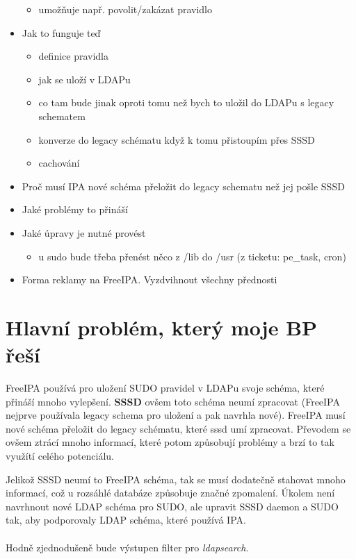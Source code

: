 \documentclass[10pt,a4paper,notitlepage]{article}
\begin{document}
\begin{itemize}
	\begin{itemize}
		\item umožňuje např. povolit/zakázat pravidlo
	\end{itemize}
		
	\item Jak to funguje teď

	\begin{itemize}
		\item definice pravidla
		\item jak se uloží v LDAPu
		\item co tam bude jinak oproti tomu než bych to uložil do LDAPu s legacy
			schematem
		\item konverze do legacy schématu když k tomu přistoupím přes SSSD
		\item cachování
	\end{itemize}
	\item Proč musí IPA nové schéma přeložit do legacy schematu než jej pošle
		SSSD
	\item Jaké problémy to přináší
	\item Jaké úpravy je nutné provést
	\begin{itemize}
		\item u sudo bude třeba přenést něco z /lib do /usr (z ticketu: pe\_task,
			cron)
	\end{itemize}
	\item Forma reklamy na FreeIPA. Vyzdvihnout všechny přednosti
\end{itemize}

\section*{Hlavní problém, který moje BP řeší}
FreeIPA používá pro uložení SUDO pravidel v LDAPu svoje schéma, které přináší
mnoho vylepšení. \textbf{SSSD} ovšem toto schéma neumí zpracovat (FreeIPA
nejprve používala legacy schema pro uložení a pak navrhla nové). FreeIPA musí
nové schéma přeložit do legacy schématu, které sssd umí zpracovat. Převodem se
ovšem ztrácí mnoho informací, které potom způsobují problémy a brzí to tak
využítí celého potenciálu.

Jelikož SSSD neumí to FreeIPA schéma, tak se musí dodatečně stahovat mnoho
informací, což u rozsáhlé databáze způsobuje značné zpomalení. Úkolem není
navrhnout nové LDAP schéma pro SUDO, ale upravit SSSD daemon a SUDO tak, aby
podporovaly LDAP schéma, které používá IPA.
\\
\\
Hodně zjednodušeně bude výstupen filter pro \emph{ldapsearch}.
\end{document}
